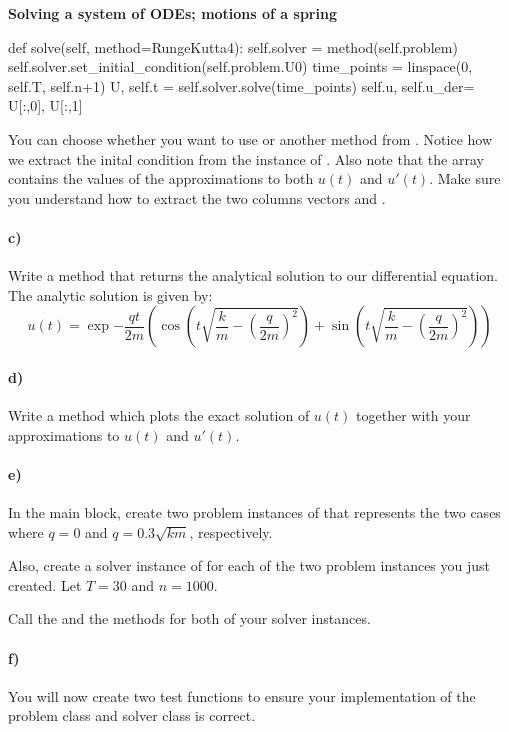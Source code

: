 \begin{Problem}{\textbf{Solving a system of ODEs; motions of a spring}}
\begin{python}
def solve(self, method=RungeKutta4):
        self.solver = method(self.problem)
        self.solver.set_initial_condition(self.problem.U0)
        time_points = linspace(0, self.T, self.n+1)
        U, self.t = self.solver.solve(time_points)
        self.u, self.u_der= U[:,0], U[:,1]
\end{python}
\noindent
 You can choose whether you want to use  or another method from . Notice how we extract the inital condition  from the  instance of . Also note that the array  contains the values of the approximations to both $u(t)$ and $u'(t)$. Make sure you understand how to extract the two columns vectors  and .

\paragraph{c)}
Write a method  that returns the analytical solution to our differential equation.
The analytic solution is given by:
$$
u(t) = \exp{-\frac{qt}{2m}}\left(\cos\left(t\sqrt{\frac{k}{m}-\left(\frac{q}{2m}\right)^2}\right) + \sin\left(t\sqrt{\frac{k}{m}-\left(\frac{q}{2m}\right)^2}\right)\right)
$$

\paragraph{d)}
Write a method  which plots the exact solution of $u(t)$ together with your approximations to $u(t)$ and $u'(t)$.

\paragraph{e)}
In the main block, create two problem instances of  that represents the two cases where $q=0$ and $q=0.3\sqrt{km}$, respectively.

Also, create a solver instance of  for each of the two problem instances you just created. Let $T=30$ and $n=1000$.  

Call the  and the  methods for both of your solver instances.

\paragraph{f)}
You will now create two test functions to ensure your implementation of the problem class and solver class is correct.


\end{Problem}
